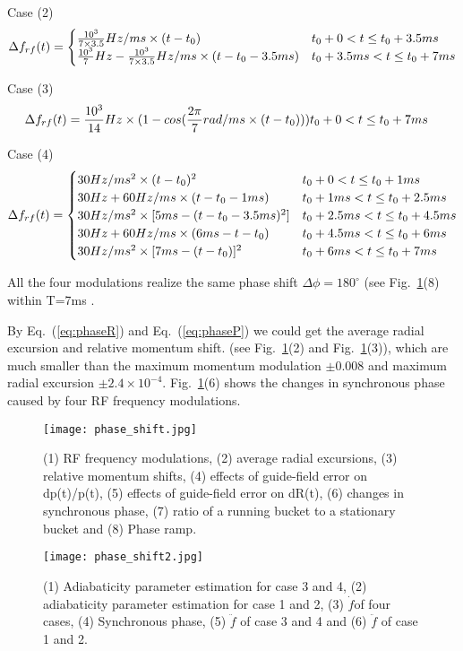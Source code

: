 Case (2) 
\begin{eqnarray}\Delta f_{rf}(t)=
\begin{cases}
\frac{10^3}{7\times 3.5}Hz/ms \times (t-t_0) &t_0+0<t\le t_0+3.5ms\cr  \frac{10^3}{7}Hz-{\frac{10^3}{7\times 3.5}Hz/ms}\times {(t-t_0-3.5ms)} &t_0+3.5ms<t\le t_0+7ms \cr 
\end{cases}
\end{eqnarray}

Case (3) 
\begin{eqnarray}\Delta f_{rf}(t)=
\frac{10^3}{14}Hz \times (1-cos(\frac{2\pi}{7} rad/ms\times (t-t_0))) &t_0+0<t\le t_0+7ms\cr  
\end{eqnarray}

Case (4) 
\begin{eqnarray}\Delta f_{rf}(t)=
\begin{cases}
30Hz/ms^2 \times (t-t_0)^2 &t_0+0<t\le t_0+1ms\cr  
30Hz + 60Hz/ms\times (t-t_0 -1ms) &t_0+1ms<t\le t_0+2.5ms\cr 
30Hz/ms^2 \times [5ms-(t-t_0-3.5ms)^2] &t_0+2.5ms<t\le t_0+4.5ms\cr  
30Hz + 60Hz/ms\times (6ms-t-t_0) &t_0+4.5ms<t\le t_0+6ms\cr  
30Hz/ms^2 \times [7ms-(t-t_0)]^2 &t_0+6ms<t\le t_0+7ms\cr  
\end{cases}
\end{eqnarray}

All the four modulations realize the same phase shift $\Delta \phi = 180^\circ $ (see Fig.~\ref{phaseshift}(8) within T=7ms . 

By Eq.~(\ref{eq:phaseR}) and Eq.~(\ref{eq:phaseP}) we could get the average radial excursion and relative momentum shift. (see Fig.~\ref{phaseshift}(2) and Fig.~\ref{phaseshift}(3)), which are much smaller than the maximum momentum modulation $\pm 0.008$ and maximum radial excursion $\pm 2.4\times10^{-4}$. Fig.~\ref{phaseshift}(6) shows the changes in synchronous phase caused by four RF frequency modulations.

\begin{figure}[!htb]
   \centering
   \texttt{[image: phase\_shift.jpg]}
   \caption{ (1) RF frequency modulations, (2) average radial excursions, (3) relative momentum shifts, (4) effects of guide-field error on dp(t)/p(t), (5) effects of guide-field error on dR(t), (6) changes in synchronous phase, (7) ratio of a running bucket to a stationary bucket and (8) Phase ramp.}
   \label{phaseshift}
\end{figure}

\begin{figure}[!htb]
   \centering
   \texttt{[image: phase\_shift2.jpg]}
   \caption{ (1)  Adiabaticity parameter estimation for case 3 and 4, (2)  adiabaticity parameter estimation for case 1 and 2, (3) $\dot f$of four cases, (4)  Synchronous phase, (5) $\ddot f$ of case 3 and 4 and (6)  $\ddot f$ of case 1 and 2.}
   \label{phaseshift2}
\end{figure}


